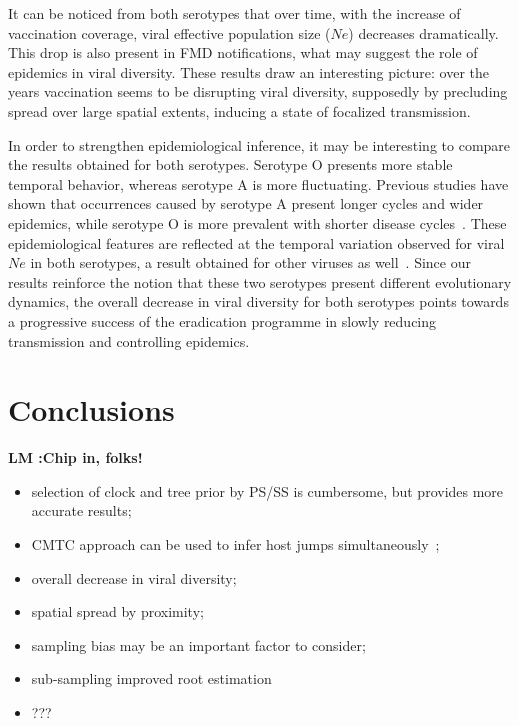 \documentclass[10pt]{article}
\begin{document}


It can be noticed from both serotypes that over time, with the increase of vaccination coverage, viral effective population size ($Ne$) decreases dramatically.
This drop is also present in FMD notifications, what may suggest the role of epidemics in viral diversity.
These results draw an interesting picture: over the years vaccination seems to be disrupting viral diversity, supposedly by precluding spread over large spatial extents, inducing a state of focalized transmission.

In order to strengthen epidemiological inference, it may be interesting to compare the results obtained for both serotypes.
Serotype O presents more stable temporal behavior, whereas serotype A is more fluctuating.
Previous studies have shown that occurrences caused by serotype A present longer cycles and wider epidemics, while serotype O is more prevalent with shorter disease cycles~\cite{colombiatime}.
These epidemiological features are reflected at the temporal variation observed for viral $Ne$ in both serotypes, a result obtained for other viruses as well~\cite{Bennett2010,Pybus2003}. 
Since our results reinforce the notion that these two serotypes present different evolutionary dynamics, the overall decrease in viral diversity for both serotypes points towards a progressive success of the eradication programme in slowly reducing transmission and controlling epidemics.

\section*{Conclusions}
{\bf LM :Chip in, folks!}
\begin{itemize}
 \item selection of clock and tree prior by PS/SS is cumbersome, but provides more accurate results;
 \item CMTC approach can be used to infer host jumps simultaneously~\cite{hall2013};
 \item overall decrease in viral diversity;
 \item spatial spread by proximity;
 \item sampling bias may be an important factor to consider;
 \item sub-sampling improved root estimation %
 \item ???
\end{itemize}
\end{document}
